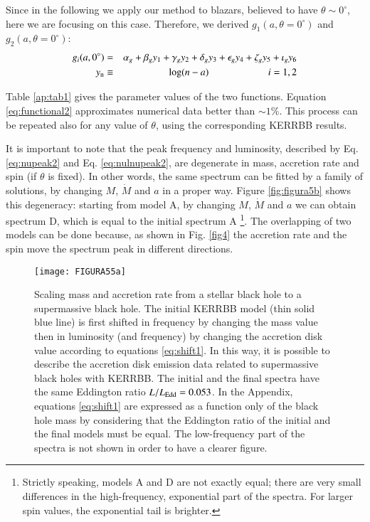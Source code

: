 \documentclass{aa}
\begin{document}
Since in the following we apply our method to blazars, believed to have $\theta \sim 0^{\circ}$, here we are focusing on this case. Therefore, we derived $g_1(a, \theta=0^{\circ})$ and $g_2(a, \theta=0^{\circ})$:
	\begin{eqnarray} \label{eq:functional2}
		g_i(a, 0^{\circ}) &=& \alpha_g + \beta_g y_1 + \gamma_g y_2 + \delta_g y_3 + \epsilon_g y_4 +\zeta_g y_5 + \iota_g y_6
		\nonumber \\
		y_{\rm n} &\equiv& \log(n-a) \qquad \qquad \qquad i = 1, 2
	\end{eqnarray}

Table \ref{ap:tab1} gives the parameter values of the two functions. Equation \ref{eq:functional2} approximates numerical data better than $\sim 1 \%$. This process can be repeated also for any value of $\theta$, using the corresponding KERRBB results. 

It is important to note that the peak frequency and luminosity, described by Eq. \eqref{eq:nupeak2} and Eq. \eqref{eq:nulnupeak2}, are degenerate in mass, accretion rate and spin (if $\theta$ is fixed). In other words, the same spectrum can be fitted by a family of solutions, by changing $M$, $\dot{M}$ and $a$ in a proper way. Figure \ref{fig:figura5b} shows this degeneracy: starting from model A, by changing $M$, $\dot{M}$ and $a$ we can obtain spectrum D, which is equal to the initial spectrum A \footnote{Strictly speaking, models A and D are not exactly equal; there are very small differences in the high-frequency, exponential part of the spectra. For larger spin values, the exponential tail is brighter.}. The overlapping of two models can be done because, as shown in Fig. \ref{fig4} the accretion rate and the spin move the spectrum peak in different directions. 

\begin{figure}
\centering
\texttt{[image: FIGURA55a]}
\caption{
Scaling mass and accretion rate from a stellar black hole to a supermassive black hole. The initial KERRBB model (thin solid blue line) is first shifted in frequency by changing the mass value then in luminosity (and frequency) by changing the accretion disk value according to equations \eqref{eq:shift1}. In this way, it is possible to describe the accretion disk emission data related to supermassive black holes with KERRBB. The initial and the final spectra have the same Eddington ratio $L / L_{\rm Edd} = 0.053$. In the Appendix, equations \eqref{eq:shift1} are expressed as a function only of the black hole mass by considering that the Eddington ratio of the initial and the final models must be equal. The low-frequency part of the spectra is not shown in order to have a clearer figure.}
\label{fig:figura5a}
\end{figure}
\end{document}
